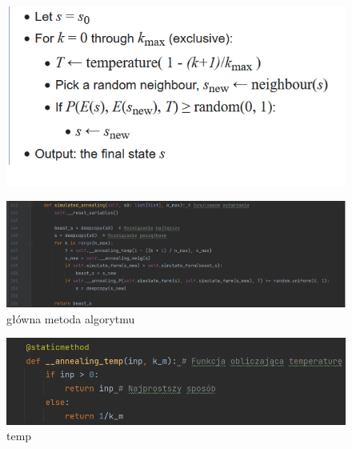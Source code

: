 \documentclass[12pt,a4paper]{article}
\begin{document}
\begin{figure}[H]
	\centering
	\includegraphics[width=1\linewidth]{screens/pseudocode}
	\caption{}
	\label{fig:pseudocode}
\end{figure}



\begin{figure}[H]
	\centering
	\includegraphics[width=1\linewidth]{screens/anealing_main}
	\caption{główna metoda algorytmu}
	\label{fig:anealingmain}
\end{figure}



\begin{figure}[H]
	\centering
	\includegraphics[width=1\linewidth]{screens/anealing_temp}
	\caption{temp}
	\label{fig:anealingtemp}
\end{figure}
\end{document}
